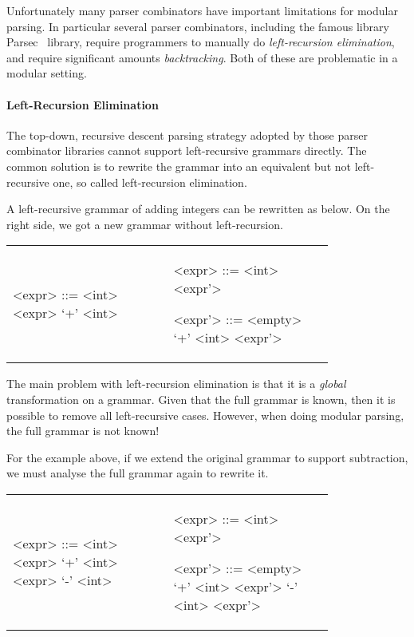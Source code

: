 Unfortunately many parser combinators have important limitations for
modular parsing. In particular several parser combinators,
including the famous library Parsec~\cite{Leijen2001} library, require
programmers to manually do \textit{left-recursion elimination}, and
require significant amounts \textit{backtracking}. Both of these are
problematic in a modular setting.

\paragraph{Left-Recursion Elimination} The top-down, recursive descent parsing strategy adopted by those parser combinator libraries cannot support left-recursive grammars directly. The common solution is to rewrite the grammar into an equivalent but not left-recursive one, so called left-recursion elimination.

A left-recursive grammar of adding integers can be rewritten as below. On the right side, we got a new grammar without left-recursion.

\begin{tabular}{m{0.4\linewidth}m{0.4\linewidth}}
\setlength{\grammarindent}{5em}
\begin{grammar}
<expr> ::= <int> \alt <expr> `+' <int>
\end{grammar}
&
\setlength{\grammarindent}{5em}
\begin{grammar}
<expr> ::= <int> <expr'>

<expr'> ::= <empty> \alt `+' <int> <expr'>
\end{grammar}
\end{tabular}

The main problem with left-recursion elimination is that it is a
\emph{global} transformation on a grammar. Given that the full grammar
is known, then it is possible to remove all left-recursive
cases. However, when doing modular parsing, the full grammar is not
known!

For the example above, if we extend the original grammar to support
subtraction, we must analyse the full grammar again to rewrite it.

\begin{tabular}{m{0.4\linewidth}m{0.4\linewidth}}
\setlength{\grammarindent}{5em}
\begin{grammar}
<expr> ::= <int> \alt <expr> `+' <int> \alt <expr> `-' <int>
\end{grammar}
&
\setlength{\grammarindent}{5em}
\begin{grammar}
<expr> ::= <int> <expr'>

<expr'> ::= <empty> \alt `+' <int> <expr'> \alt `-' <int> <expr'>
\end{grammar}
\end{tabular}


